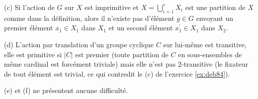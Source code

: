 {{\smallskip

(c) Si l'action de $G$ sur $X$ est imprimitive et $X=\bigcup_{i=1}^r X_i$ est une partition de
$X$ comme dans la d\'efinition, alors il n'existe pas d'\'el\'ement $g\in G$ envoyant un
premier \'el\'ement $x_1\in X_1$ dans $X_1$ et un second \'el\'ement $x_1^\prime \in X_1$
dans $X_2$.
\smallskip

(d) L'action par translation d'un groupe cyclique $C$ sur lui-m\^eme est transitive, elle est
primitive si $|C|$ est premier (toute partition de $C$ en sous-ensembles de m\^eme cardinal
est forc\'ement triviale) mais elle n'est pas $2$-transitive (le fixateur de
tout \'el\'ement est trivial, ce qui contredit le (c) de l'exercice \ref{ex:deb84}).
\smallskip

(e) et (f) ne pr\'esentent aucune difficult\'e.}
}
